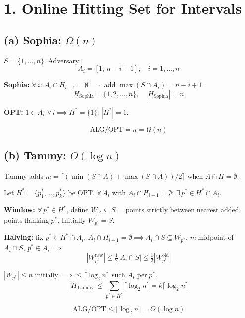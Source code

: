 \documentclass[11pt]{article}
\begin{document}
\section*{1. Online Hitting Set for Intervals}

\vspace{-10pt}
\subsection*{(a) Sophia: $\Omega(n)$}

$S = \{1, \ldots, n\}$. Adversary:
\[
A_i = [1,\, n{-}i{+}1], \quad i = 1, \ldots, n
\]

\textbf{Sophia:} $\forall\, i$: $A_i \cap H_{i-1} = \emptyset \implies$ add $\max(S \cap A_i) = n{-}i{+}1$.
\[
H_{\text{Sophia}} = \{1, 2, \ldots, n\}, \quad |H_{\text{Sophia}}| = n
\]

\textbf{OPT:} $1 \in A_i$ $\forall\, i \implies H^* = \{1\}$, $|H^*| = 1$.

\vspace{-8pt}
\[\boxed{\mathrm{ALG}/\mathrm{OPT} = n = \Omega(n)}\]

\vspace{-20pt}
\subsection*{(b) Tammy: $O(\log n)$}

Tammy adds $m = \lceil (\min(S \cap A) + \max(S \cap A))/2 \rceil$ when $A \cap H = \emptyset$.

Let $H^* = \{p_1^*, \ldots, p_k^*\}$ be OPT. $\forall\, A_i$ with $A_i \cap H_{i-1} = \emptyset$: $\exists\, p^* \in H^* \cap A_i$.

\textbf{Window:} $\forall\, p^* \in H^*$, define $W_{p^*} \subseteq S$ = points strictly between nearest added points flanking $p^*$. Initially $W_{p^*} = S$.

\textbf{Halving:} fix $p^* \in H^* \cap A_i$. $A_i \cap H_{i-1} = \emptyset \implies A_i \cap S \subseteq W_{p^*}$. $m$ midpoint of $A_i \cap S$, $p^* \in A_i \implies$
\[
|W_{p^*}^{\text{new}}| \le \tfrac{1}{2}|A_i \cap S| \le \tfrac{1}{2}|W_{p^*}^{\text{old}}|
\]

$|W_{p^*}| \le n$ initially $\implies \le \lceil \log_2 n \rceil$ such $A_i$ per $p^*$.
\[
|H_{\text{Tammy}}| \le \sum_{p^* \in H^*} \lceil \log_2 n \rceil = k \lceil \log_2 n \rceil
\]

\vspace{-8pt}
\[\boxed{\mathrm{ALG}/\mathrm{OPT} \le \lceil \log_2 n \rceil = O(\log n)}\]
\end{document}
